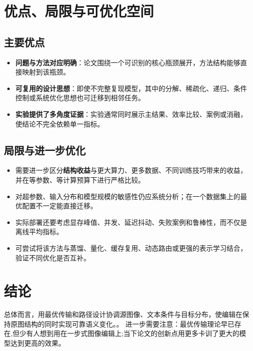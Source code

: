 \documentclass[UTF8,11pt,a4paper]{ctexart}
\newcommand{\term}[1]{\textbf{\textcolor{mainblue}{#1}}}
\begin{document}
\section{优点、局限与可优化空间}
\subsection{主要优点}
\begin{itemize}
\item \term{问题与方法对应明确}：论文围绕一个可识别的核心瓶颈展开，方法结构能够直接映射到该瓶颈。
\item \term{可复用的设计思想}：即使不完整复现模型，其中的分解、稀疏化、递归、条件控制或系统优化思想也可迁移到相邻任务。
\item \term{实验提供了多角度证据}：实验通常同时展示主结果、效率比较、案例或消融，使结论不完全依赖单一指标。
\end{itemize}

\subsection{局限与进一步优化}
\begin{itemize}
\item 需要进一步区分\term{结构收益}与更大算力、更多数据、不同训练技巧带来的收益，并在等参数、等计算预算下进行严格比较。
\item 对超参数、输入分布和模型规模的敏感性仍应系统分析；在一个数据集上的最优配置不一定能直接迁移。
\item 实际部署还要考虑显存峰值、并发、延迟抖动、失败案例和鲁棒性，而不仅是离线平均指标。
\item 可尝试将该方法与蒸馏、量化、缓存复用、动态路由或更强的表示学习结合，验证不同优化是否互补。
\end{itemize}

\section{结论}
总体而言，用最优传输和路径设计协调源图像、文本条件与目标分布，使编辑在保持原图结构的同时实现可靠语义变化。。 进一步需要注意：最优传输理论早已存在,但少有人想到用在一步式图像编辑上;当下论文的创新点用更多卡训了更大的模型达到更高的效果。
\end{document}
